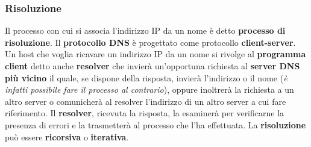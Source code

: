 \documentclass[11pt,a4paper,oneside]{book}
\theoremstyle{definition}
\begin{document}
\subsubsection{Risoluzione}

Il processo con cui si associa l'indirizzo IP da un nome è detto \textbf{processo di risoluzione}. Il \textbf{protocollo DNS} è progettato come protocollo \textbf{client-server}. Un host che voglia ricavare un indirizzo IP da un nome si rivolge al \textbf{programma client} detto anche \textbf{resolver} che invierà un'opportuna richiesta al \textbf{server DNS più vicino} il quale, se dispone della risposta, invierà l'indirizzo o il nome (\textit{è infatti possibile fare il processo al contrario}), oppure inoltrerà la richiesta a un altro server o comunicherà al resolver l'indirizzo di un altro server a cui fare riferimento. Il \textbf{resolver}, ricevuta la risposta, la esaminerà per verificarne la presenza di errori e la trasmetterà al processo che l'ha effettuata. La \textbf{risoluzione} può essere \textbf{ricorsiva} o \textbf{iterativa}.

\pagebreak
\end{document}
